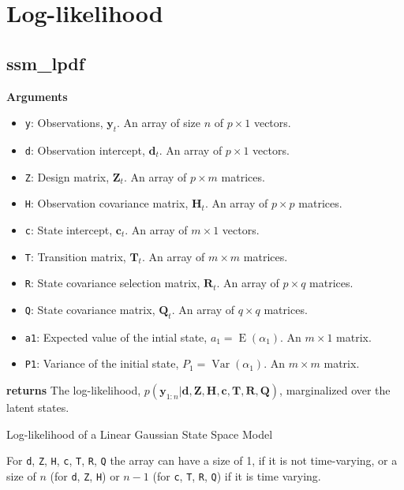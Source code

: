 \documentclass[]{book}
\providecommand{\tightlist}{%
  \setlength{\itemsep}{0pt}\setlength{\parskip}{0pt}}
\DeclareMathOperator{\E}{E}
\DeclareMathOperator{\Var}{Var}
\newcommand{\mat}[1]{\boldsymbol{#1}}
\renewcommand{\vec}[1]{\boldsymbol{#1}}
\begin{document}
\section{Log-likelihood}\label{log-likelihood}

\subsection{ssm\_lpdf}\label{ssm_lpdf}

\textbf{Arguments}

\begin{itemize}
\tightlist
\item
  \texttt{y}: Observations, \(\vec{y}_t\). An array of size \(n\) of
  \(p \times 1\) vectors.
\item
  \texttt{d}: Observation intercept, \(\vec{d}_t\). An array of
  \(p \times 1\) vectors.
\item
  \texttt{Z}: Design matrix, \(\mat{Z}_t\). An array of \(p \times m\)
  matrices.
\item
  \texttt{H}: Observation covariance matrix, \(\mat{H}_t\). An array of
  \(p \times p\) matrices.
\item
  \texttt{c}: State intercept, \(\vec{c}_t\). An array of \(m \times 1\)
  vectors.
\item
  \texttt{T}: Transition matrix, \(\mat{T}_t\). An array of
  \(m \times m\) matrices.
\item
  \texttt{R}: State covariance selection matrix, \(\mat{R} _t\). An
  array of \(p \times q\) matrices.
\item
  \texttt{Q}: State covariance matrix, \(\mat{Q}_t\). An array of
  \(q \times q\) matrices.
\item
  \texttt{a1}: Expected value of the intial state,
  \(a_1 = \E(\alpha_1)\). An \(m \times 1\) matrix.
\item
  \texttt{P1}: Variance of the initial state, \(P_1 = \Var(\alpha_1)\).
  An \(m \times m\) matrix.
\end{itemize}

\textbf{returns} The log-likelihood,
\(p(\vec{y}_{1:n} | \vec{d}, \mat{Z}, \mat{H}, \vec{c}, \mat{T}, \mat{R}, \mat{Q})\),
marginalized over the latent states.

Log-likelihood of a Linear Gaussian State Space Model

For \texttt{d}, \texttt{Z}, \texttt{H}, \texttt{c}, \texttt{T},
\texttt{R}, \texttt{Q} the array can have a size of 1, if it is not
time-varying, or a size of \(n\) (for \texttt{d}, \texttt{Z},
\texttt{H}) or \(n - 1\) (for \texttt{c}, \texttt{T}, \texttt{R},
\texttt{Q}) if it is time varying.
\end{document}
